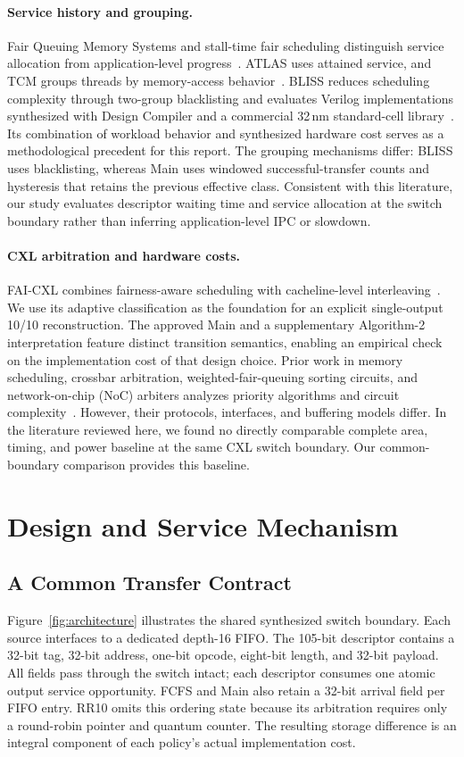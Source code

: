 \paragraph{Service history and grouping.}
Fair Queuing Memory Systems and stall-time fair scheduling distinguish service
allocation from application-level progress~\cite{fqmem,stfm}. ATLAS uses attained
service, and TCM groups threads by memory-access behavior~\cite{atlas,tcm}.
BLISS reduces scheduling complexity through two-group blacklisting and evaluates
Verilog implementations synthesized with Design Compiler and a commercial
32\,nm standard-cell library~\cite{bliss}. Its combination of workload behavior
and synthesized hardware cost serves as a methodological precedent for this report.
The grouping mechanisms differ: BLISS uses blacklisting, whereas Main uses
windowed successful-transfer counts and hysteresis that retains the previous
effective class.
Consistent with this literature, our study evaluates descriptor waiting time
and service allocation at the switch boundary rather than inferring
application-level IPC or slowdown.

\paragraph{CXL arbitration and hardware costs.}
FAI-CXL combines fairness-aware scheduling with cacheline-level
interleaving~\cite{fai}. We use its adaptive classification as the foundation
for an explicit single-output 10/10 reconstruction. The approved Main and a
supplementary Algorithm-2 interpretation feature distinct transition semantics,
enabling an empirical check on the implementation cost of that design choice.
Prior work in memory scheduling, crossbar arbitration, weighted-fair-queuing
sorting circuits, and network-on-chip (NoC) arbiters analyzes priority algorithms
and circuit complexity~\cite{rixner,gupta,wfq_sort,arbiter_ppa}. However, their
protocols, interfaces, and buffering models differ. In the literature reviewed
here, we found no directly comparable complete area, timing, and power baseline
at the same CXL switch boundary. Our common-boundary comparison provides this
baseline.

\section{Design and Service Mechanism}
\subsection{A Common Transfer Contract}
Figure~\ref{fig:architecture} illustrates the shared synthesized switch boundary. Each source
interfaces to a dedicated depth-16 FIFO. The 105-bit descriptor contains a 32-bit tag, 32-bit address,
one-bit opcode, eight-bit length, and 32-bit payload. All fields pass through the switch intact;
each descriptor consumes one atomic output service opportunity. FCFS and Main
also retain a 32-bit arrival field per FIFO entry. RR10 omits this ordering state
because its arbitration requires only a round-robin pointer and quantum counter. The resulting storage difference
is an integral component of each policy's actual implementation cost.

